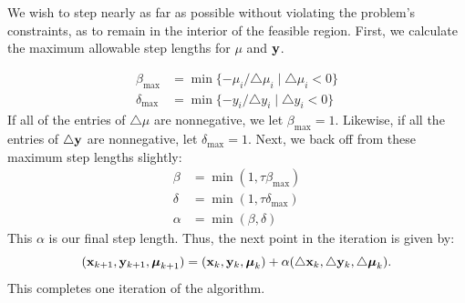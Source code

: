 We wish to step nearly as far as possible without violating the problem’s constraints, as to remain in the interior of the feasible region.
First, we calculate the maximum allowable step lengths for $\mu$ and $\mathbf{y}$.

\begin{align*}
\beta_{\max} &= \min\{-\mu_i/\triangle \mu_i \mid \triangle \mu_i < 0 \}\\
\delta_{\max} &=\min\{-y_i/\triangle y_i \mid \triangle y_i < 0 \}
\end{align*}
If all of the entries of $\triangle \mu$ are nonnegative, we let $\beta_{\max} = 1$.
Likewise, if all the entries of $\triangle \mathbf{y}$ are nonnegative, let $\delta_{\max}=1$.
Next, we back off from these maximum step lengths slightly:
\begin{align*}
\beta &= \min(1, \tau\beta_{\max})\\
\delta &= \min(1, \tau\delta_{\max})\\
\alpha &= \min(\beta, \delta)
\end{align*}
This $\alpha$ is our final step length.
Thus, the next point in the iteration is given by:
\[
(\mathbf{x}_{k+1}, \mathbf{y}_{k+1}, \boldsymbol{\mu}_{k+1}) = (\mathbf{x}_k, \mathbf{y}_k, \boldsymbol{\mu}_k) + \alpha(\triangle \mathbf{x}_k, \triangle \mathbf{y}_k, \triangle \boldsymbol{\mu}_k).
\]
This completes one iteration of the algorithm.

